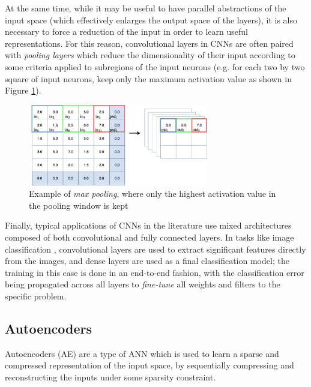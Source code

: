At the same time, while it may be useful to have parallel abstractions of the 
input space (which effectively enlarges the output space of the layers), it is
also necessary to force a reduction of the input in order to learn useful 
representations. 
For this reason, convolutional layers in CNNs are often paired with 
\textit{pooling layers} which reduce the dimensionality of their input according
to some criteria applied to subregions of the input neurons (e.g. for each two 
by two square of input neurons, keep only the maximum activation value as 
shown in Figure \ref{f:max-pooling}).
%
\begin{figure}[h]
\includegraphics[width=0.7\textwidth]{pictures/max-pooling}
\centering
\caption[Max pooling]{Example of \textit{max pooling}, where only the highest 
		      activation value in the pooling window is kept}
\label{f:max-pooling}
\end{figure}
%

Finally, typical applications of CNNs in the literature use mixed 
architectures composed of both convolutional and fully connected layers.
In tasks like image classification \cite{simonyan2014vggnet, szegedy2015going}, 
convolutional layers are used to extract significant features directly from the 
images, and dense layers are used as a final classification model; the training 
in this case is done in an end-to-end fashion, with the classification error 
being propagated across all layers to \textit{fine-tune} all weights and filters
to the specific problem.

\subsection{Autoencoders} \label{s:AE}
Autoencoders (AE) are a type of ANN which is used to learn a sparse and 
compressed representation of the input space, by sequentially compressing and 
reconstructing the inputs under some sparsity constraint.

